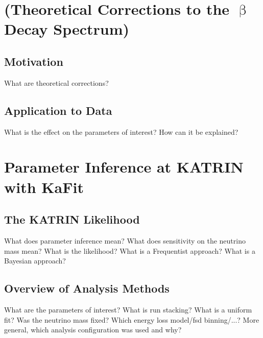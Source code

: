 \documentclass{document/thesisclass}
\begin{document}
    \FrontMatter

    
    

    \begingroup \let\clearpage\relax    %
    \tableofcontents                    %
    \listoffigures
    \listoftables
    \endgroup
    \cleardoublepage

    \MainMatter
    
    
    
    
    
    \chapter{(Theoretical Corrections to the \texorpdfstring{$\upbeta$}{Beta} Decay Spectrum)}
    \section{Motivation}
    What are theoretical corrections?
    
    \section{Application to Data}
    What is the effect on the parameters of interest? How can it be explained? 
    
    
    
    \chapter{Parameter Inference at KATRIN with KaFit}
    
    \section{The KATRIN Likelihood}
    What does parameter inference mean? What does sensitivity on the neutrino mass mean? What is the likelihood? What is a Frequentist approach? What is a Bayesian approach? 
    \section{Overview of Analysis Methods}
    What are the parameters of interest? What is run stacking? What is a uniform fit? Was the neutrino mass fixed? Which energy loss model/fsd binning/...? More general, which analysis configuration was used and why?
    
\end{document}

